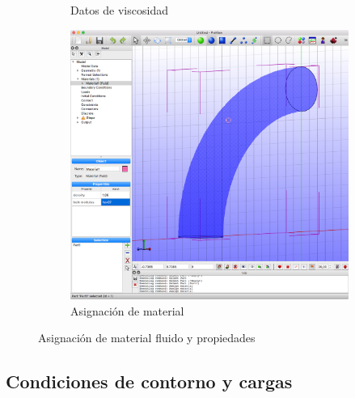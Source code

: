 \begin{figure}[!ht]
\begin{subfigure}[b]{0.25\textwidth}
\caption{Datos de viscosidad}
\label{fig:04d_material}
\end{subfigure}
\hfil
\begin{subfigure}[b]{0.58\textwidth}
\includegraphics[width=\linewidth]{figuras_4/04c_material.png}
\caption{Asignación de material}
\label{fig:04c_material}
\end{subfigure}
\caption{Asignación de material fluido y propiedades}
\label{fig:04dc_material}
\end{figure}

\clearpage
\subsection{Condiciones de contorno y cargas}

